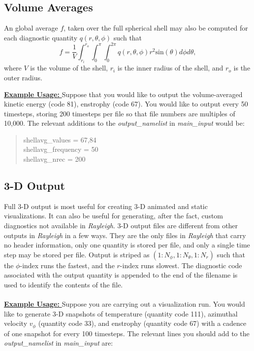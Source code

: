 \documentclass[12pt,letterpaper]{article}
\begin{document}
\subsection{Volume Averages}
An global average $f$, taken over the full spherical shell may also be computed for each diagnostic quantity $q(r,\theta,\phi)$ such that
\begin{equation}
\label{eq:savg}
f = \frac{1}{V}\int_{r_i}^{r_o}\int_0^{\pi}\int_0^{2\pi}q(r,\theta,\phi)r^2\mathrm{sin}(\theta)d\phi d\theta,
\end{equation}
where $V$ is the volume of the shell, $r_i$ is the inner radius of the shell, and $r_o$ is the outer radius.


\noindent\underline{\textbf{Example Usage:  }}
Suppose that you would like to output the volume-averaged kinetic energy (code 81), enstrophy (code 67). You would like to output every 50 timesteps, storing 200 timesteps per file so that file numbers are multiples of 10,000.  The relevant additions to the \textit{output\_namelist} in  \textit{main\_input}  would be:
\blockquote{\noindent shellavg\_values = 67,84
\\
\noindent shellavg\_frequency = 50
\\
\noindent shellavg\_nrec = 200
}


\subsection{3-D Output}
Full 3-D output is most useful for creating 3-D animated and static visualizations.  It can also be useful for generating, after the fact, custom diagnostics not available in \textit{Rayleigh}.  3-D output files are different from other outputs in \textit{Rayleigh} in a few ways.  They are the only files in \textit{Rayleigh} that carry no header information, only one quantity is stored per file, and only a single time step may be stored per file.  Output is striped as $(1:N_\phi,1:N_\theta,1:N_r)$ such that the $\phi$-index runs the fastest, and the $r$-index runs slowest.  The diagnostic code associated with the output quantity is appended to the end of the filename is used to identify the contents of the file.
\\
\\
\noindent\underline{\textbf{Example Usage:  }}
Suppose you are carrying out a visualization run.  You would like to generate 3-D snapshots of temperature (quantity code 111), azimuthal velocity $v_\phi$ (quantity code 33), and enstrophy (quantity code 67) with a cadence of one snapshot for every 100 timesteps.  The relevant lines you should add to the \textit{output\_namelist} in  \textit{main\_input}  are:
\end{document}
